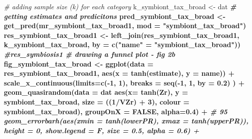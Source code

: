 \documentclass[
]{article}
\newenvironment{Shaded}{\begin{snugshade}}{\end{snugshade}}
\newcommand{\CommentTok}[1]{\textcolor[rgb]{0.56,0.35,0.01}{\textit{#1}}}
\newcommand{\DataTypeTok}[1]{\textcolor[rgb]{0.13,0.29,0.53}{#1}}
\newcommand{\DecValTok}[1]{\textcolor[rgb]{0.00,0.00,0.81}{#1}}
\newcommand{\FloatTok}[1]{\textcolor[rgb]{0.00,0.00,0.81}{#1}}
\newcommand{\KeywordTok}[1]{\textcolor[rgb]{0.13,0.29,0.53}{\textbf{#1}}}
\newcommand{\NormalTok}[1]{#1}
\newcommand{\OperatorTok}[1]{\textcolor[rgb]{0.81,0.36,0.00}{\textbf{#1}}}
\newcommand{\OtherTok}[1]{\textcolor[rgb]{0.56,0.35,0.01}{#1}}
\newcommand{\StringTok}[1]{\textcolor[rgb]{0.31,0.60,0.02}{#1}}
\begin{document}
\begin{Shaded}
\begin{Highlighting}[]
\CommentTok{# adding sample size (k) for each category}
\NormalTok{k_symbiont_tax_broad <-}\StringTok{ }\NormalTok{dat }\OperatorTok{%
\CommentTok{# getting estimates and predicitons}
\NormalTok{pred_symbiont_tax_broad <-}\StringTok{ }\KeywordTok{get_pred}\NormalTok{(mr_symbiont_tax_broad1, }\DataTypeTok{mod =} \StringTok{"symbiont_tax_broad"}\NormalTok{) }
\NormalTok{res_symbiont_tax_broad1 <-}\StringTok{ }\KeywordTok{left_join}\NormalTok{(res_symbiont_tax_broad1, k_symbiont_tax_broad, }\DataTypeTok{by =}  \KeywordTok{c}\NormalTok{(}\StringTok{"name"}\NormalTok{ =}\StringTok{ "symbiont_tax_broad"}\NormalTok{))  }\OperatorTok{%
\CommentTok{#res_symbiosis1 }
\CommentTok{# drawing a funnel plot - fig 2b}
\NormalTok{fig_symbiont_tax_broad <-}\StringTok{ }\KeywordTok{ggplot}\NormalTok{(}\DataTypeTok{data =}\NormalTok{ res_symbiont_tax_broad1, }\KeywordTok{aes}\NormalTok{(}\DataTypeTok{x =} \KeywordTok{tanh}\NormalTok{(estimate), }\DataTypeTok{y =}\NormalTok{ name)) }\OperatorTok{+}
\StringTok{  }\KeywordTok{scale_x_continuous}\NormalTok{(}\DataTypeTok{limits=}\KeywordTok{c}\NormalTok{(}\OperatorTok{-}\DecValTok{1}\NormalTok{, }\DecValTok{1}\NormalTok{), }\DataTypeTok{breaks =} \KeywordTok{seq}\NormalTok{(}\OperatorTok{-}\DecValTok{1}\NormalTok{, }\DecValTok{1}\NormalTok{, }\DataTypeTok{by =} \FloatTok{0.2}\NormalTok{) ) }\OperatorTok{+}
\StringTok{  }\KeywordTok{geom_quasirandom}\NormalTok{(}\DataTypeTok{data =}\NormalTok{ dat }\OperatorTok{%
                   \KeywordTok{aes}\NormalTok{(}\DataTypeTok{x=} \KeywordTok{tanh}\NormalTok{(Zr), }\DataTypeTok{y =}\NormalTok{ symbiont_tax_broad, }\DataTypeTok{size =}\NormalTok{ ((}\DecValTok{1}\OperatorTok{/}\NormalTok{VZr) }\OperatorTok{+}\StringTok{ }\DecValTok{3}\NormalTok{), }\DataTypeTok{colour =}\NormalTok{ symbiont_tax_broad), }\DataTypeTok{groupOnX =} \OtherTok{FALSE}\NormalTok{, }\DataTypeTok{alpha=}\FloatTok{0.4}\NormalTok{) }\OperatorTok{+}\StringTok{ }
\StringTok{  }\CommentTok{# 95 %
\StringTok{  }\KeywordTok{geom_errorbarh}\NormalTok{(}\KeywordTok{aes}\NormalTok{(}\DataTypeTok{xmin =} \KeywordTok{tanh}\NormalTok{(lowerPR), }\DataTypeTok{xmax =} \KeywordTok{tanh}\NormalTok{(upperPR)),  }\DataTypeTok{height =} \DecValTok{0}\NormalTok{, }\DataTypeTok{show.legend =}\NormalTok{ F, }\DataTypeTok{size =} \FloatTok{0.5}\NormalTok{, }\DataTypeTok{alpha =} \FloatTok{0.6}\NormalTok{) }\OperatorTok{+}
}}}}
\end{Highlighting}
\end{Shaded}
\end{document}

